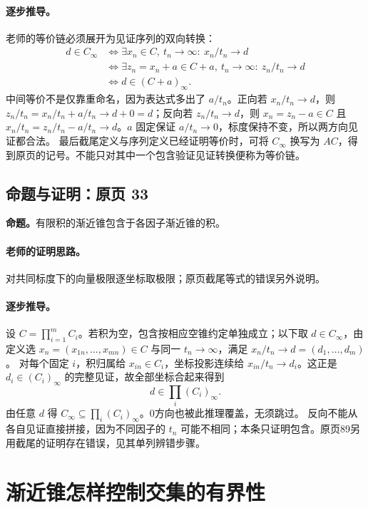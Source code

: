 \paragraph{逐步推导。}
老师的等价链必须展开为见证序列的双向转换：
\begin{align*}
d\in C_\infty
&\iff\exists x_n\in C,\ t_n\to\infty:\ x_n/t_n\to d\\
&\iff\exists z_n=x_n+a\in C+a,\ t_n\to\infty:\ z_n/t_n\to d\\
&\iff d\in(C+a)_\infty.
\end{align*}
中间等价不是仅靠重命名，因为表达式多出了 $a/t_n$。正向若 $x_n/t_n\to d$，则 $z_n/t_n=x_n/t_n+a/t_n\to d+0=d$；反向若 $z_n/t_n\to d$，则 $x_n=z_n-a\in C$ 且 $x_n/t_n=z_n/t_n-a/t_n\to d$。$a$ 固定保证 $a/t_n\to0$，标度保持不变，所以两方向见证都合法。
最后截尾定义与序列定义已经证明等价时，可将 $C_\infty$ 换写为 $AC$，得到原页的记号。不能只对其中一个包含验证见证转换便称为等价链。


\subsection{命题与证明：原页 33}

\textbf{命题。}有限积的渐近锥包含于各因子渐近锥的积。

\paragraph{老师的证明思路。}对共同标度下的向量极限逐坐标取极限；原页截尾等式的错误另外说明。

\paragraph{逐步推导。}
设 $C=\prod_{i=1}^mC_i$。若积为空，包含按相应空锥约定单独成立；以下取 $d\in C_\infty$，由定义选 $x_n=(x_{1n},\ldots,x_{mn})\in C$ 与同一 $t_n\to\infty$，满足 $x_n/t_n\to d=(d_1,\ldots,d_m)$。
对每个固定 $i$，积归属给 $x_{in}\in C_i$，坐标投影连续给 $x_{in}/t_n\to d_i$。这正是 $d_i\in(C_i)_\infty$ 的完整见证，故全部坐标合起来得到
\[d\in\prod_i(C_i)_\infty.\]
由任意 $d$ 得 $C_\infty\subseteq\prod_i(C_i)_\infty$。0方向也被此推理覆盖，无须跳过。
反向不能从各自见证直接拼接，因为不同因子的 $t_n$ 可能不相同；本条只证明包含。原页89另用截尾的证明存在错误，见其单列辨错步骤。


\clearpage\section{渐近锥怎样控制交集的有界性}\label{g:109:34}

